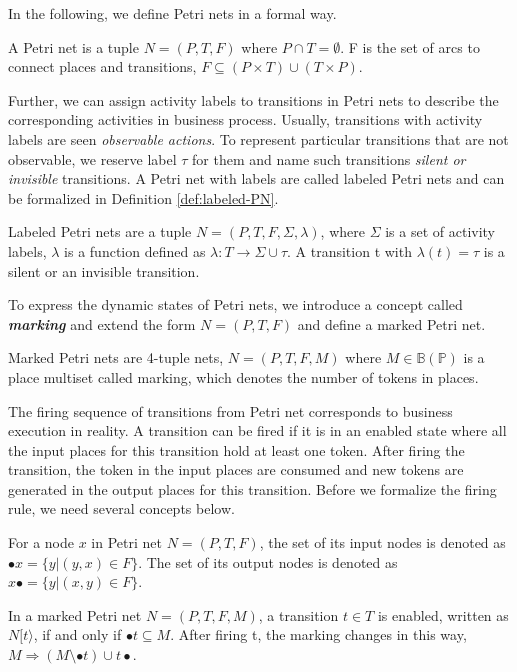 In the following, we define Petri nets in a formal way.
\begin{definition}
	A Petri net is a tuple $N=(P,T,F)$ where $P \cap T = \emptyset $. F is the set of arcs to connect places and transitions, $F \subseteq (P\times T)\cup (T \times P)$.
\end{definition}
Further, we can assign activity labels to transitions in Petri nets to describe the corresponding activities in business process. Usually, transitions with activity labels are seen \emph{observable actions}. To represent particular transitions that are not observable, we reserve label $\tau$ for them and name such transitions \emph{silent or invisible} transitions. A Petri net with labels are called labeled Petri nets and can be formalized in Definition \ref{def:labeled-PN}.
\begin{definition}\label{def:labeled-PN}	
	Labeled Petri nets are a tuple $N=(P,T,F, \Sigma, \lambda)$, where $\Sigma$ is a set of activity labels, $\lambda$ is a function defined as $\lambda: T \rightarrow \Sigma \cup \tau$. A transition t with $\lambda(t)=\tau$ is a silent or an invisible transition.
\end{definition}
To express the dynamic states of Petri nets, we introduce a concept called \textbf{\emph{marking}} and extend the form  $N=(P,T,F)$ and define a marked Petri net. 
\begin{definition}
Marked Petri nets are 4-tuple nets, $N=(P,T,F,M)$ where $M \in \mathbb{B(P)}$ is a place multiset called marking, which denotes the number of tokens in places.
\end{definition}
The firing sequence of transitions from Petri net corresponds to business execution in reality. A transition can be fired if it is in an enabled state where all the input places for this transition hold at least one token. After firing the transition, the token in the input places are consumed and new tokens are generated in the output places for this transition. Before we formalize the firing rule, we need several concepts below.
\begin{definition}
	For a node $x$ in Petri net $N=(P,T,F)$, the set of its input nodes is denoted as $\bullet x = \{y\vert (y,x)\in F\}$. The set of its output nodes is denoted as $x\bullet = \{y\vert (x,y)\in F\}$.
\end{definition}
\begin{definition}
	In a marked Petri net $N=(P,T,F,M)$, a transition $t\in T$ is enabled, written as $N[t\rangle$, if and only if $\bullet t \subseteq M$. After firing t, the marking changes in this way, $M \Rightarrow (M\setminus\bullet t)\cup t\bullet$.
\end{definition}
